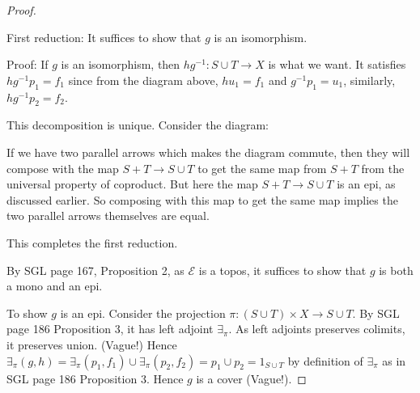 \documentclass[a4paper]{article}
\begin{document}
\begin{proof}
    \begin{center}
    \end{center}

    First reduction: It suffices to show that $g$ is an isomorphism.

    Proof: If $g$ is an isomorphism, then $hg^{-1}:S\cup T\to X$ is what we want. It satisfies $hg^{-1}p_1=f_1$ since from the diagram above, $hu_1=f_1$ and $g^{-1}p_1=u_1$, similarly, $hg^{-1}p_2=f_2$. 
    
    This decomposition is unique. Consider the diagram:

    \begin{center}
    \end{center}

    If we have two parallel arrows which makes the diagram commute, then they will compose with the map $S+T\to S\cup T$ to get the same map from $S+T$ from the universal property of coproduct. But here the map $S+T\to S\cup T$ is an epi, as discussed earlier. So composing with this map to get the same map implies the two parallel arrows themselves are equal. 

    This completes the first reduction.

    By SGL page 167, Proposition 2, as $\mathcal E$ is a topos, it suffices to show that $g$ is both a mono and an epi. 

    To show $g$ is an epi. Consider the projection $\pi: (S\cup T)\times X\to S\cup T$. By SGL page 186 Proposition 3, it has left adjoint $\exists_\pi$. As left adjoints preserves colimits, it preserves union. (Vague!) Hence $\exists_\pi (g,h)=\exists_{\pi} (p_1,f_1) \cup \exists_\pi (p_2,f_2)=p_1\cup p_2 = 1_{S\cup T}$ by definition of $\exists_{\pi}$ as in SGL page 186 Proposition 3. Hence $g$ is a cover (Vague!). 


\end{proof}
\end{document}
